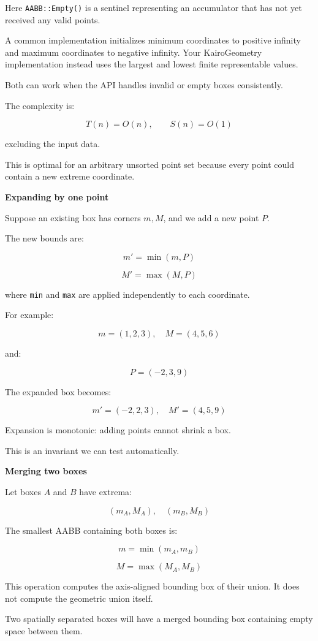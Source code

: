 Here \texttt{AABB::Empty()} is a sentinel representing an accumulator that has not yet received any valid points.

A common implementation initializes minimum coordinates to positive infinity and maximum coordinates to negative infinity. Your KairoGeometry implementation instead uses the largest and lowest finite representable values.

Both can work when the API handles invalid or empty boxes consistently.

The complexity is:

\[
T(n)=O(n),\qquad S(n)=O(1)
\]

excluding the input data.

This is optimal for an arbitrary unsorted point set because every point could contain a new extreme coordinate.

\textbf{Expanding by one point}

Suppose an existing box has corners \(m,M\), and we add a new point \(P\).

The new bounds are:

\[
m'=\min(m,P)
\]

\[
M'=\max(M,P)
\]

where \texttt{min} and \texttt{max} are applied independently to each coordinate.

For example:

\[
m=(1,2,3),\quad M=(4,5,6)
\]

and:

\[
P=(-2,3,9)
\]

The expanded box becomes:

\[
m'=(-2,2,3),\quad M'=(4,5,9)
\]

Expansion is monotonic: adding points cannot shrink a box.

This is an invariant we can test automatically.

\textbf{Merging two boxes}

Let boxes \(A\) and \(B\) have extrema:

\[
(m_A,M_A),\quad(m_B,M_B)
\]

The smallest AABB containing both boxes is:

\[
\boxed{ m=\min(m_A,m_B) }
\]

\[
\boxed{ M=\max(M_A,M_B) }
\]

This operation computes the axis-aligned bounding box of their union. It does not compute the geometric union itself.

Two spatially separated boxes will have a merged bounding box containing empty space between them.

